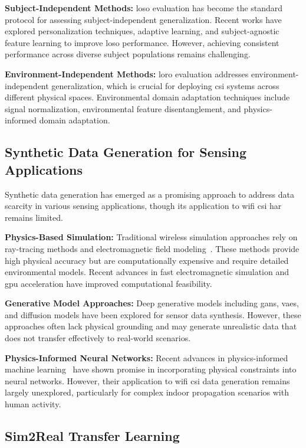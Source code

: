 \documentclass[journal]{IEEEtran}
\begin{document}
\textbf{Subject-Independent Methods:} \gls{loso} evaluation has become the standard protocol for assessing subject-independent generalization. Recent works have explored personalization techniques, adaptive learning, and subject-agnostic feature learning to improve \gls{loso} performance. However, achieving consistent performance across diverse subject populations remains challenging.

\textbf{Environment-Independent Methods:} \gls{loro} evaluation addresses environment-independent generalization, which is crucial for deploying \gls{csi} systems across different physical spaces. Environmental domain adaptation techniques include signal normalization, environmental feature disentanglement, and physics-informed domain adaptation.

\subsection{Synthetic Data Generation for Sensing Applications}

Synthetic data generation has emerged as a promising approach to address data scarcity in various sensing applications, though its application to \gls{wifi} \gls{csi} \gls{har} remains limited.

\textbf{Physics-Based Simulation:} Traditional wireless simulation approaches rely on ray-tracing methods and electromagnetic field modeling~\cite{ray_tracing_wireless2000}. These methods provide high physical accuracy but are computationally expensive and require detailed environmental models. Recent advances in fast electromagnetic simulation and \gls{gpu} acceleration have improved computational feasibility.

\textbf{Generative Model Approaches:} Deep generative models including \glspl{gan}, \glspl{vae}, and diffusion models have been explored for sensor data synthesis. However, these approaches often lack physical grounding and may generate unrealistic data that does not transfer effectively to real-world scenarios.

\textbf{Physics-Informed Neural Networks:} Recent advances in physics-informed machine learning~\cite{pinn_karniadakis2021} have shown promise in incorporating physical constraints into neural networks. However, their application to \gls{wifi} \gls{csi} data generation remains largely unexplored, particularly for complex indoor propagation scenarios with human activity.

\subsection{Sim2Real Transfer Learning}
\end{document}
